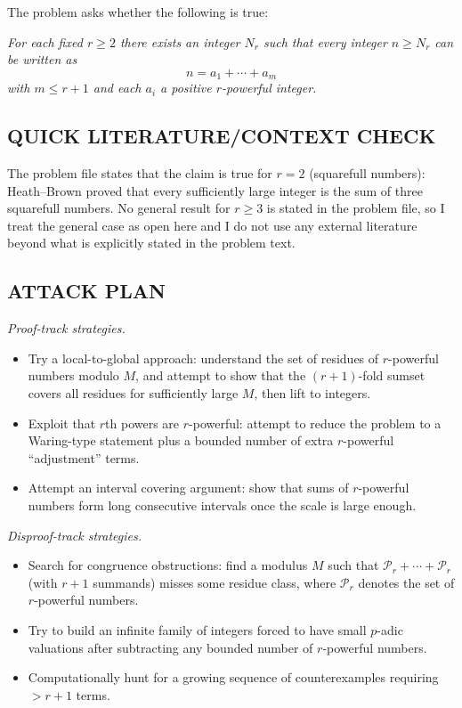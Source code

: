The problem asks whether the following is true:

\emph{For each fixed $r\ge 2$ there exists an integer $N_r$ such that every integer $n\ge N_r$ can be written as}
\[n=a_1+\cdots+a_m\]
\emph{with $m\le r+1$ and each $a_i$ a positive $r$-powerful integer.}

\subsection*{QUICK LITERATURE/CONTEXT CHECK}
The problem file states that the claim is true for $r=2$ (squarefull numbers): Heath--Brown proved that every sufficiently large integer is the sum of three squarefull numbers.
No general result for $r\ge 3$ is stated in the problem file, so I treat the general case as open here and I do not use any external literature beyond what is explicitly stated in the problem text.

\subsection*{ATTACK PLAN}
\emph{Proof-track strategies.}
\begin{itemize}
\item Try a local-to-global approach: understand the set of residues of $r$-powerful numbers modulo $M$, and attempt to show that the $(r+1)$-fold sumset covers all residues for sufficiently large $M$, then lift to integers.
\item Exploit that $r$th powers are $r$-powerful: attempt to reduce the problem to a Waring-type statement plus a bounded number of extra $r$-powerful ``adjustment'' terms.
\item Attempt an interval covering argument: show that sums of $r$-powerful numbers form long consecutive intervals once the scale is large enough.
\end{itemize}

\emph{Disproof-track strategies.}
\begin{itemize}
\item Search for congruence obstructions: find a modulus $M$ such that $\mathcal{P}_r+\cdots+\mathcal{P}_r$ (with $r+1$ summands) misses some residue class, where $\mathcal{P}_r$ denotes the set of $r$-powerful numbers.
\item Try to build an infinite family of integers forced to have small $p$-adic valuations after subtracting any bounded number of $r$-powerful numbers.
\item Computationally hunt for a growing sequence of counterexamples requiring $>r+1$ terms.
\end{itemize}

